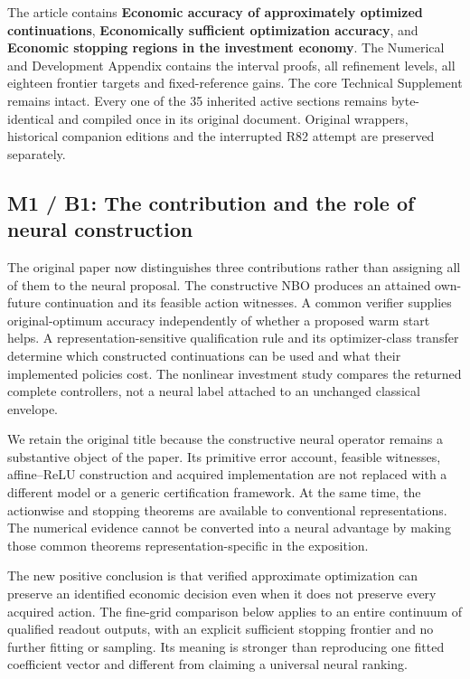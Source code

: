 The article contains \textbf{Economic accuracy of approximately
optimized continuations}, \textbf{Economically sufficient optimization
accuracy}, and \textbf{Economic stopping regions in the investment
economy}. The Numerical and Development Appendix contains the interval
proofs, all refinement levels, all eighteen frontier targets and
fixed-reference gains. The core Technical Supplement remains intact.
Every one of the 35 inherited active sections remains byte-identical and
compiled once in its original document. Original wrappers, historical
companion editions and the interrupted R82 attempt are preserved
separately.

\hypertarget{m1-b1-the-contribution-and-the-role-of-neural-construction}{%
\subsection{M1 / B1: The contribution and the role of neural
construction}\label{m1-b1-the-contribution-and-the-role-of-neural-construction}}

The original paper now distinguishes three contributions rather than
assigning all of them to the neural proposal. The constructive NBO
produces an attained own-future continuation and its feasible action
witnesses. A common verifier supplies original-optimum accuracy
independently of whether a proposed warm start helps. A
representation-sensitive qualification rule and its optimizer-class
transfer determine which constructed continuations can be used and what
their implemented policies cost. The nonlinear investment study compares
the returned complete controllers, not a neural label attached to an
unchanged classical envelope.

We retain the original title because the constructive neural operator
remains a substantive object of the paper. Its primitive error account,
feasible witnesses, affine--ReLU construction and acquired
implementation are not replaced with a different model or a generic
certification framework. At the same time, the actionwise and stopping
theorems are available to conventional representations. The numerical
evidence cannot be converted into a neural advantage by making those
common theorems representation-specific in the exposition.

The new positive conclusion is that verified approximate optimization
can preserve an identified economic decision even when it does not
preserve every acquired action. The fine-grid comparison below applies
to an entire continuum of qualified readout outputs, with an explicit
sufficient stopping frontier and no further fitting or sampling. Its
meaning is stronger than reproducing one fitted coefficient vector and
different from claiming a universal neural ranking.

